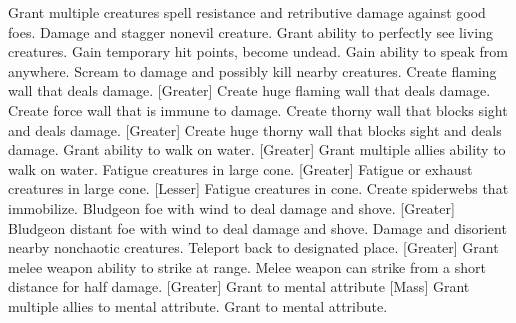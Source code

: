     {Grant multiple creatures spell resistance and retributive damage against good foes.}
    {Damage and stagger nonevil creature.}
    {Grant ability to perfectly see living creatures.}
    {Gain temporary hit points, become undead.}
    {Gain ability to speak from anywhere.}
    {Scream to damage and possibly kill nearby creatures.}
    {Create flaming wall that deals damage.}
[Greater]
    {Create huge flaming wall that deals damage.}
    {Create force wall that is immune to damage.}
    {Create thorny wall that blocks sight and deals damage.}
[Greater]
    {Create huge thorny wall that blocks sight and deals damage.}
    {Grant ability to walk on water.}
[Greater]
    {Grant multiple allies ability to walk on water.}
    {Fatigue creatures in large cone.}
[Greater]
    {Fatigue or exhaust creatures in large cone.}
[Lesser]
    {Fatigue creatures in cone.}
    {Create spiderwebs that immobilize.}
    {Bludgeon foe with wind to deal damage and shove.}
[Greater]
    {Bludgeon distant foe with wind to deal damage and shove.}
    {Damage and disorient nearby nonchaotic creatures.}
    {Teleport back to designated place.}
[Greater]
    {Grant melee weapon ability to strike at range.}
    {Melee weapon can strike from a short distance for half damage.}
[Greater]
    {Grant  to mental attribute}
[Mass]
    {Grant multiple allies  to mental attribute.}
    {Grant  to mental attribute.}
